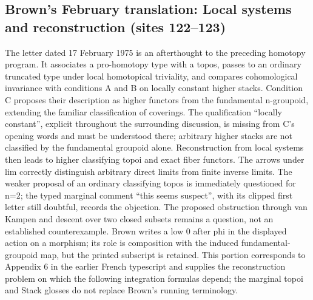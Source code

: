 \documentclass[10pt,oneside]{book}
\begin{document}
\subsection*{Brown's February translation: Local systems and reconstruction (sites 122--123)}
The letter dated 17 February 1975 is an afterthought to the preceding homotopy program. It associates a pro-homotopy type with a topos, passes to an ordinary truncated type under local homotopical triviality, and compares cohomological invariance with conditions A and B on locally constant higher stacks. Condition C proposes their description as higher functors from the fundamental n-groupoid, extending the familiar classification of coverings. The qualification ``locally constant'', explicit throughout the surrounding discussion, is missing from C's opening words and must be understood there; arbitrary higher stacks are not classified by the fundamental groupoid alone. Reconstruction from local systems then leads to higher classifying topoi and exact fiber functors. The arrows under lim correctly distinguish arbitrary direct limits from finite inverse limits. The weaker proposal of an ordinary classifying topos is immediately questioned for n=2; the typed marginal comment ``this seems suspect'', with its clipped first letter still doubtful, records the objection. The proposed obstruction through van Kampen and descent over two closed subsets remains a question, not an established counterexample. Brown writes a low 0 after phi in the displayed action on a morphism; its role is composition with the induced fundamental-groupoid map, but the printed subscript is retained. This portion corresponds to Appendix 6 in the earlier French typescript and supplies the reconstruction problem on which the following integration formulas depend; the marginal topoi and Stack glosses do not replace Brown's running terminology.
\end{document}
